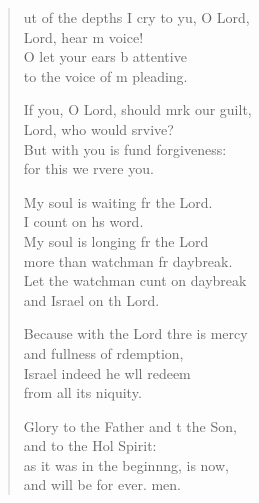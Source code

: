 \begin{verse}
  \begin{patverse}
ut of the depths I cry to yu, O Lord,\Med\\
    Lord, hear m voice!\\
O let your ears b attentive\Med\\
    to the voice of m pleading.

If you, O Lord, should mrk our guilt,\Med\\
    Lord, who would srvive?\\
But with you is fund forgiveness:\Med\\
    for this we rvere you.

My soul is waiting fr the Lord.\Med\\
    I count on h\pointup{\i}s word.\\
My soul is longing fr the Lord\Med\\
    more than watchman fr daybreak.\\
Let the watchman cunt on daybreak\Med\\
    and Israel on th Lord.

Because with the Lord thre is mercy\Med\\
    and fullness of rdemption,\\
Israel indeed he w\pointup{\i}ll redeem\Med\\
    from all its \pointup{\i}niquity.

Glory to the Father and t the Son,\Med\\
    and to the Hol Spirit:\\
as it was in the beginn\pointup{\i}ng, is now,\Med\\
    and will be for ever. men.
  \end{patverse}
\end{verse}
